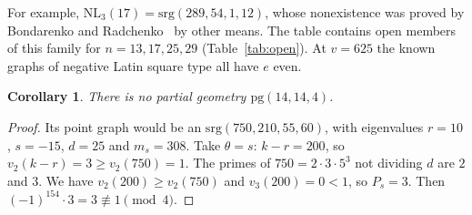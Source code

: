 \documentclass[11pt]{amsart}
\newtheorem{corollary}[theorem]{Corollary}
\theoremstyle{remark}
\begin{document}
For example, $\mathrm{NL}_3(17)=\mathrm{srg}(289,54,1,12)$, whose nonexistence was proved by Bondarenko and
Radchenko~\cite{BR} by other means. The table contains open members of this family for $n=13,17,25,29$
(Table~\ref{tab:open}). At $v=625$ the known graphs of negative Latin square type all have $e$ even.

\begin{corollary}\label{cor:pg}
There is no partial geometry $\mathrm{pg}(14,14,4)$.
\end{corollary}
\begin{proof}
Its point graph would be an $\mathrm{srg}(750,210,55,60)$, with eigenvalues $r=10$, $s=-15$, $d=25$ and $m_s=308$.
Take $\theta=s$: $k-r=200$, so $v_2(k-r)=3\ge v_2(750)=1$. The primes of $750=2\cdot3\cdot5^3$ not dividing $d$ are $2$
and $3$. We have $v_2(200)\ge v_2(750)$ and $v_3(200)=0<1$, so $P_s=3$. Then $(-1)^{154}\cdot3=3\not\equiv1\pmod4$.
\end{proof}
\end{document}

